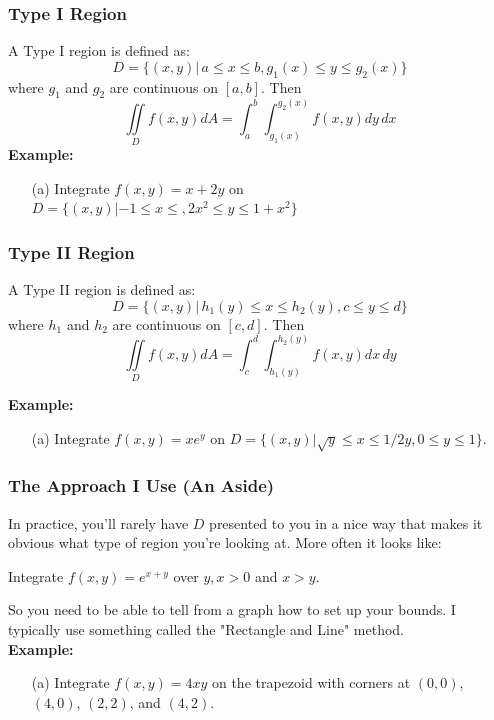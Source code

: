 \documentclass{beamer}
\begin{document}
\begin{frame}
\frametitle{\textbf{Type I Region}}
A Type I region is defined as:
$$D = \{(x,y)| \,a \leq x \leq b, g_1(x) \leq y \leq g_2(x)\}$$
where $g_1$ and $g_2$ are continuous on $[a,b]$. Then
$$\iint\limits_{D} f(x,y)dA = \int_a^b \int_{g_1(x)}^{g_2(x)} f(x,y)dy\,dx$$
\vspace{12pt}
\textbf{Example:}
\begin{itemize}
	\item [(a)] Integrate $f(x,y) = x+2y$ on $D = \{(x,y)|-1\leq x \leq, 2x^2 \leq y \leq 1+x^2\}$
\end{itemize}
\end{frame}

\begin{frame}
\frametitle{\textbf{Type II Region}}
A Type II region is defined as:
$$D = \{(x,y)| \,h_1(y) \leq x \leq h_2(y), c \leq y \leq d\}$$
where $h_1$ and $h_2$ are continuous on $[c,d]$. Then
$$\iint\limits_{D} f(x,y)dA = \int_c^d \int_{h_1(y)}^{h_2(y)} f(x,y)dx\,dy$$
\vspace{12pt}

\textbf{Example:}

\begin{itemize}
	\item[(a)] Integrate $f(x,y) = xe^{y}$ on $D = \{(x,y)|\sqrt{y}\leq x \leq 1/2y, 0\leq y \leq 1 \}$.
\end{itemize}
\end{frame}

\begin{frame}
\frametitle{\textbf{The Approach I Use (An Aside)}}
In practice, you'll rarely have $D$  presented to you in a nice way that makes it obvious what type of region you're looking at. More often it looks like:\\
\vspace{12pt}
\begin{center}
	Integrate $f(x,y) = e^{x+y}$ over $y,x>0$ and $x>y$.
\end{center}
\vspace{12pt}
So you need to be able to tell from a graph how to set up your bounds. I typically use something called the "Rectangle and Line" method.\\
\vspace{12pt}
\textbf{Example:}
\begin{itemize}
	\item[(a)] Integrate $f(x,y) = 4xy$ on the trapezoid with corners at $(0,0)$, $(4,0)$, $(2,2)$, and $(4,2)$.
\end{itemize}
\end{frame}
\end{document}
